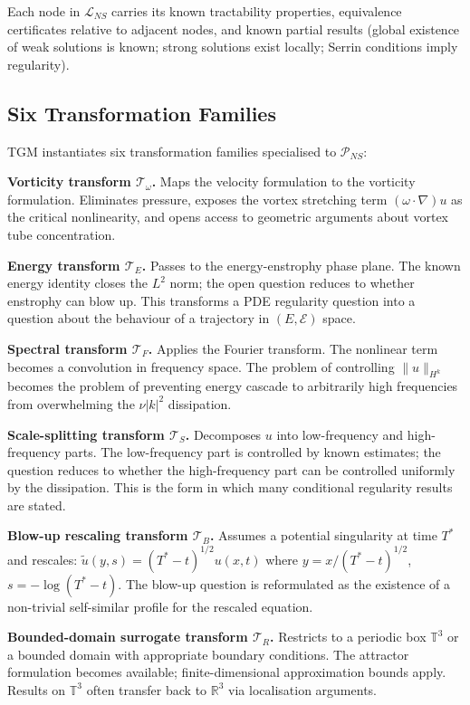 Each node in $\mathcal{L}_{NS}$ carries its known tractability properties, equivalence certificates relative to adjacent nodes, and known partial results (global existence of weak solutions is known; strong solutions exist locally; Serrin conditions imply regularity).

\subsection{Six Transformation Families}

TGM instantiates six transformation families specialised to $\mathcal{P}_{NS}$:

\textbf{Vorticity transform $\mathcal{T}_\omega$.} Maps the velocity formulation to the vorticity formulation. Eliminates pressure, exposes the vortex stretching term $(\omega\cdot\nabla)u$ as the critical nonlinearity, and opens access to geometric arguments about vortex tube concentration.

\textbf{Energy transform $\mathcal{T}_E$.} Passes to the energy-enstrophy phase plane. The known energy identity closes the $L^2$ norm; the open question reduces to whether enstrophy can blow up. This transforms a PDE regularity question into a question about the behaviour of a trajectory in $(E, \mathcal{E})$ space.

\textbf{Spectral transform $\mathcal{T}_F$.} Applies the Fourier transform. The nonlinear term becomes a convolution in frequency space. The problem of controlling $\|u\|_{H^k}$ becomes the problem of preventing energy cascade to arbitrarily high frequencies from overwhelming the $\nu|k|^2$ dissipation.

\textbf{Scale-splitting transform $\mathcal{T}_S$.} Decomposes $u$ into low-frequency and high-frequency parts. The low-frequency part is controlled by known estimates; the question reduces to whether the high-frequency part can be controlled uniformly by the dissipation. This is the form in which many conditional regularity results are stated.

\textbf{Blow-up rescaling transform $\mathcal{T}_B$.} Assumes a potential singularity at time $T^*$ and rescales: $\tilde{u}(y,s) = (T^*-t)^{1/2} u(x,t)$ where $y = x/(T^*-t)^{1/2}$, $s = -\log(T^*-t)$. The blow-up question is reformulated as the existence of a non-trivial self-similar profile for the rescaled equation.

\textbf{Bounded-domain surrogate transform $\mathcal{T}_R$.} Restricts to a periodic box $\mathbb{T}^3$ or a bounded domain with appropriate boundary conditions. The attractor formulation becomes available; finite-dimensional approximation bounds apply. Results on $\mathbb{T}^3$ often transfer back to $\mathbb{R}^3$ via localisation arguments.


